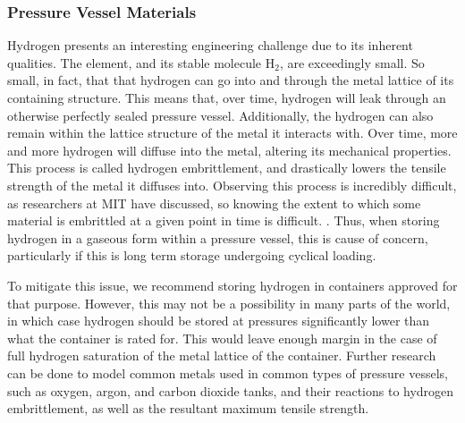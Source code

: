 \documentclass[conf]{new-aiaa}
\begin{document}
\subsubsection{Pressure Vessel Materials}
Hydrogen presents an interesting engineering challenge due to its inherent qualities. The element, and its stable molecule $\text{H}_2$, are exceedingly small. So small, in fact, that that hydrogen can go into and through the metal lattice of its containing structure. This means that, over time, hydrogen will leak through an otherwise perfectly sealed pressure vessel. Additionally, the hydrogen can also remain within the lattice structure of the metal it interacts with. Over time, more and more hydrogen will diffuse into the metal, altering its mechanical properties. This process is called hydrogen embrittlement, and drastically lowers the tensile strength of the metal it diffuses into. Observing this process is incredibly difficult, as researchers at MIT have discussed, so knowing the extent to which some material is embrittled at a given point in time is difficult. \cite{MITNews:h2}. Thus, when storing hydrogen in a gaseous form within a pressure vessel, this is cause of concern, particularly if this is long term storage undergoing cyclical loading.

To mitigate this issue, we recommend storing hydrogen in containers approved for that purpose. However, this may not be a possibility in many parts of the world, in which case hydrogen should be stored at pressures significantly lower than what the container is rated for. This would leave enough margin in the case of full hydrogen saturation of the metal lattice of the container. Further research can be done to model common metals used in common types of pressure vessels, such as oxygen, argon, and carbon dioxide tanks, and their reactions to hydrogen embrittlement, as well as the resultant maximum tensile strength.
\end{document}
